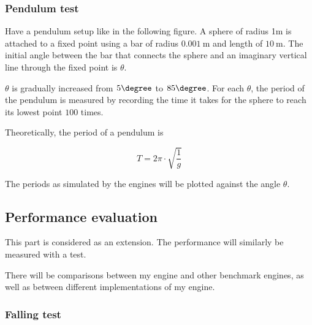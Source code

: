 \subsubsection{Pendulum test}

Have a pendulum setup like in the following figure.
A sphere of radius 1m is attached to a fixed point using a bar of radius $\SI{0.001}{\m}$ and length of $\SI{10}{\m}$.
The initial angle between the bar that connects the sphere and an imaginary vertical line through the fixed point is $\theta$.

\begin{center}
  \end{center}

$\theta$ is gradually increased from $5\degree$ to $85\degree$.
For each $\theta$, 
the period of the pendulum is measured by recording the time it takes for the sphere to reach its lowest point $100$ times.

Theoretically, the period of a pendulum is

\begin{equation}
T = 2  \pi \cdot \sqrt{\frac{1}{g}}
\end{equation}

The periods as simulated by the engines will be plotted against the angle $\theta$.

\subsection{Performance evaluation}

This part is considered as an extension. The performance will similarly be measured with a test.

There will be comparisons between my engine and other benchmark engines, as well as between different implementations of my engine.

\subsubsection{Falling test}


